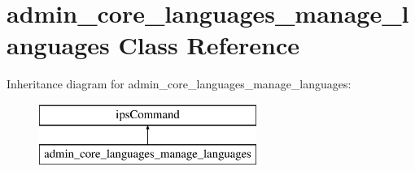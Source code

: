 \hypertarget{classadmin__core__languages__manage__languages}{\section{admin\-\_\-core\-\_\-languages\-\_\-manage\-\_\-languages Class Reference}
\label{classadmin__core__languages__manage__languages}
}
Inheritance diagram for admin\-\_\-core\-\_\-languages\-\_\-manage\-\_\-languages\-:\begin{figure}[H]
\begin{center}
\leavevmode
\includegraphics[height=2.000000cm]{classadmin__core__languages__manage__languages}
\end{center}
\end{figure}
